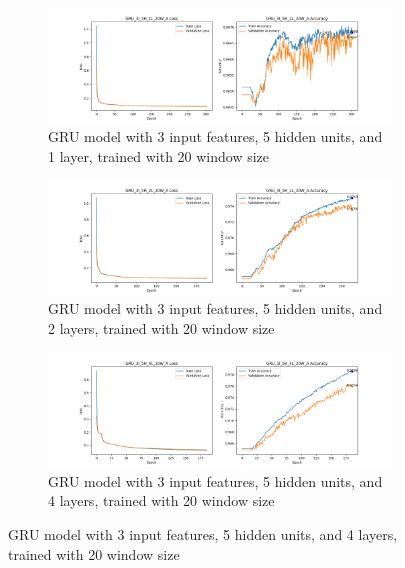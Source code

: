 \documentclass{article}
\begin{document}
    \begin{figure}[ht]
        \centering
        \begin{subfigure}
            {\textwidth}
            \centering
            \includegraphics[width=\textwidth]{GRU_3I_5H_1L_20W_A_GRAPH.png}
            \caption{GRU model with 3 input features, 5 hidden units, and 1
            layer, trained with 20 window size}
            \label{fig:GRU_3I_5H_1L_20W_A_GRAPH}
        \end{subfigure}
        \begin{subfigure}
            {\textwidth}
            \centering
            \includegraphics[width=\textwidth]{GRU_3I_5H_2L_20W_A_GRAPH.png}
            \caption{GRU model with 3 input features, 5 hidden units, and 2
            layers, trained with 20 window size}
            \label{fig:GRU_3I_5H_2L_20W_A_GRAPH}
        \end{subfigure}
        \begin{subfigure}
            {\textwidth}
            \centering
            \includegraphics[width=\textwidth]{GRU_3I_5H_4L_20W_A_GRAPH.png}
            \caption{GRU model with 3 input features, 5 hidden units, and 4
            layers, trained with 20 window size}

\end{subfigure}
\end{figure}
\end{document}

